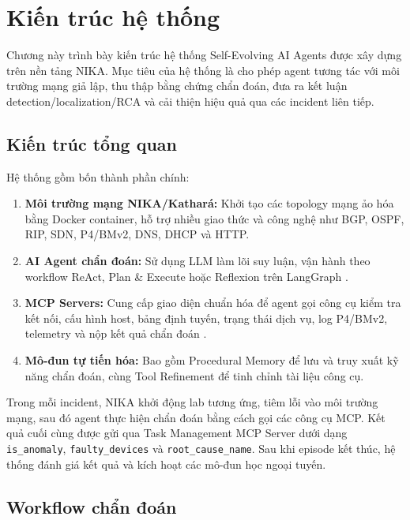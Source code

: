 \chapter{Kiến trúc hệ thống}
\label{chap:architecture}

Chương này trình bày kiến trúc hệ thống Self-Evolving AI Agents được xây dựng trên nền tảng NIKA. Mục tiêu của hệ thống là cho phép agent tương tác với môi trường mạng giả lập, thu thập bằng chứng chẩn đoán, đưa ra kết luận detection/localization/RCA và cải thiện hiệu quả qua các incident liên tiếp.

\section{Kiến trúc tổng quan}
\label{sec:overall_arch}

Hệ thống gồm bốn thành phần chính:
\begin{enumerate}
    \item \textbf{Môi trường mạng NIKA/Kathará:} Khởi tạo các topology mạng ảo hóa bằng Docker container, hỗ trợ nhiều giao thức và công nghệ như BGP, OSPF, RIP, SDN, P4/BMv2, DNS, DHCP và HTTP.
    \item \textbf{AI Agent chẩn đoán:} Sử dụng LLM làm lõi suy luận, vận hành theo workflow ReAct, Plan \& Execute hoặc Reflexion trên LangGraph \cite{langgraph2024}.
    \item \textbf{MCP Servers:} Cung cấp giao diện chuẩn hóa để agent gọi công cụ kiểm tra kết nối, cấu hình host, bảng định tuyến, trạng thái dịch vụ, log P4/BMv2, telemetry và nộp kết quả chẩn đoán \cite{mcp2024}.
    \item \textbf{Mô-đun tự tiến hóa:} Bao gồm Procedural Memory để lưu và truy xuất kỹ năng chẩn đoán, cùng Tool Refinement để tinh chỉnh tài liệu công cụ.
\end{enumerate}

Trong mỗi incident, NIKA khởi động lab tương ứng, tiêm lỗi vào môi trường mạng, sau đó agent thực hiện chẩn đoán bằng cách gọi các công cụ MCP. Kết quả cuối cùng được gửi qua Task Management MCP Server dưới dạng \texttt{is\_anomaly}, \texttt{faulty\_devices} và \texttt{root\_cause\_name}. Sau khi episode kết thúc, hệ thống đánh giá kết quả và kích hoạt các mô-đun học ngoại tuyến.

\section{Workflow chẩn đoán}
\label{sec:agent_workflows}

